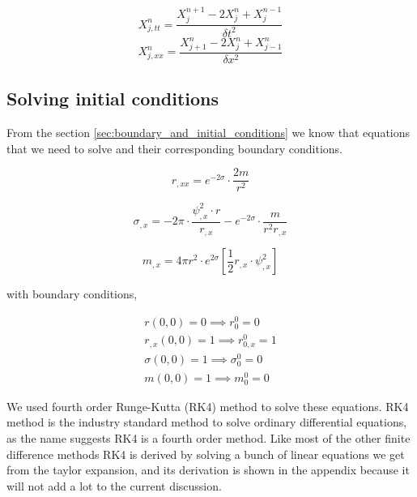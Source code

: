 \begin{equation}
    X^n_{j,tt} = \frac{X^{n+1}_{j} -2X^n_j + X^{n-1}_{j}}{\delta t^2}
\end{equation}
\begin{equation}
    X^n_{j,xx} = \frac{X^n_{j+1} -2 X^n_j+ X^n_{j-1}}{\delta x^2}
\end{equation}




\subsection{Solving initial conditions}

From the section \ref{sec:boundary_and_initial_conditions} we know that equations that we need to solve and their corresponding boundary conditions.


\begin{equation}
    r_{, x x}=e^{-2 \sigma} \cdot \frac{2 m}{r^{2}}
    \label{eqn:r_ic}
\end{equation}


\begin{equation}
    \sigma_{, x}= -2 \pi \cdot  \frac{\psi_{, x}^{2} \cdot r}{r_{,x}}- e^{-2 \sigma} \cdot \frac{ m}{r^{2}r_{, x}}
    \label{eqn:sigma_ic}
\end{equation}

\begin{equation}
    m_{, x}=4 \pi r^{2} \cdot e^{2 \sigma}\left[\frac{1}{2} r_{, x} \cdot \psi_{, x}^{2} \right]
    \label{eqn:m_ic}
\end{equation}


with boundary conditions,

\begin{eqnarray}
    r(0 ,0) = 0 \implies r^0_0 = 0 \\
    r_{,x}(0 ,0) = 1 \implies r^0_{0,x} = 1 \\
    \sigma(0 ,0) = 1 \implies \sigma^0_0 = 0 \\
    m(0 ,0) = 1 \implies m^0_0 = 0
\end{eqnarray}

We used fourth order Runge-Kutta (RK4) method to solve these equations. RK4 method is the industry standard method to solve ordinary differential equations, as the name suggests RK4 is a fourth order method. Like most of the other finite difference methods RK4 is derived by solving a bunch of linear equations we get from the taylor expansion, and its derivation is shown in the appendix because it will not add a lot to the current discussion.

